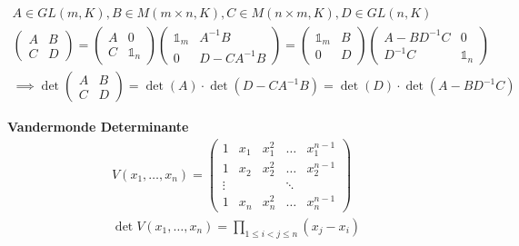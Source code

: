 \vspace{-10pt}
\begin{mdframed}
    \vspace{-10pt}
\begin{align*}
    A \in GL(m,K), B \in M(m\times n,K), C \in M(n\times m,K), D \in GL(n,K)\\
    \begin{pmatrix}
        A & B \\
        C & D
    \end{pmatrix}
    = \begin{pmatrix}
        A & 0\\
        C & \mathds{1}_n
    \end{pmatrix}
    \begin{pmatrix}
        \mathds{1}_m & A^{-1}B\\
        0 & D - CA^{-1}B
    \end{pmatrix} = \begin{pmatrix}
        \mathds{1}_m & B \\
        0 & D
    \end{pmatrix} 
    \begin{pmatrix}
        A - BD^{-1}C & 0\\
        D^{-1}C & \mathds{1}_n
    \end{pmatrix}\\
    \implies 
    \det \begin{pmatrix}
        A & B\\
        C & D
    \end{pmatrix}
    = \det (A) \cdot \det (D - CA^{-1}B) = \det (D) \cdot \det(A - BD^{-1}C) 
\end{align*}
\end{mdframed}
\textbf{Vandermonde Determinante}
\begin{align*}
    V(x_1, \ldots, x_n) = \begin{pmatrix}
        1 & x_1 & x_1^2 & \ldots & x_1^{n-1}\\
        1 & x_2 & x_2^2 & \ldots & x_2^{n-1}\\
        \vdots & & & \ddots &\\
        1 & x_n & x_n^2 & \ldots & x_n^{n-1}
    \end{pmatrix}\\
    \det V(x_1, \ldots, x_n) = \underset{1 \leq i < j \leq n}{\prod} (x_j - x_i)
\end{align*}
